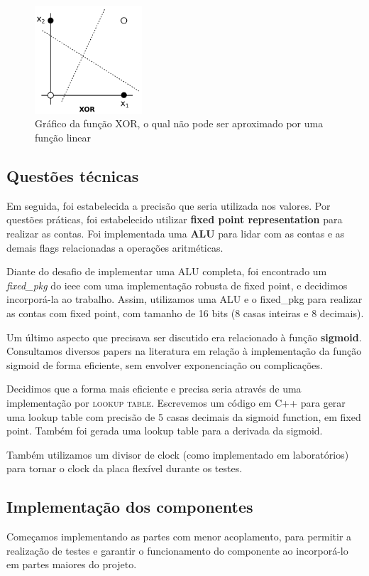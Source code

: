     \begin{figure}[ht!]
      \centering
      \includegraphics[width=4cm]{figures/xor-plot}
      \caption{Gráfico da função XOR, o qual não pode ser aproximado por uma função linear}
      \label{fig:arch}
    \end{figure}

    \subsection{Questões técnicas}
    Em seguida, foi estabelecida a precisão que seria utilizada nos valores. Por questões práticas, foi estabelecido utilizar \textbf{fixed point representation} para realizar as contas. Foi implementada uma \textbf{ALU} para lidar com as contas e as demais flags relacionadas a operações aritméticas.

    Diante do desafio de implementar uma ALU completa, foi encontrado um \textit{fixed\_pkg} do ieee com uma implementação robusta de fixed point, e decidimos incorporá-la ao trabalho. Assim, utilizamos uma ALU e o fixed\_pkg para realizar as contas com fixed point, com tamanho de 16 bits (8 casas inteiras e 8 decimais).

    Um último aspecto que precisava ser discutido era relacionado à função \textbf{sigmoid}. Consultamos diversos papers na literatura em relação à implementação da função sigmoid de forma eficiente, sem envolver exponenciação ou complicações.

    Decidimos que a forma mais eficiente e precisa seria através de uma implementação por \textsc{lookup table}. Escrevemos um código em C++ para gerar uma lookup table com precisão de 5 casas decimais da sigmoid function, em fixed point. Também foi gerada uma lookup table para a derivada da sigmoid.

    Também utilizamos um divisor de clock (como implementado em laboratórios) para tornar o clock da placa flexível durante os testes.

    \subsection{Implementação dos componentes}
    Começamos implementando as partes com menor acoplamento, para permitir a realização de testes e garantir o funcionamento do componente ao incorporá-lo em partes maiores do projeto. 

